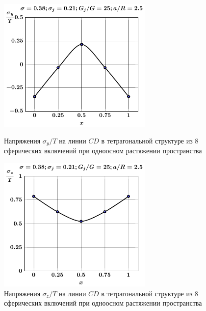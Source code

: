 \begin{russian}
%

\begin{figure}[h!]
\centering\footnotesize
\parbox[b]{7.5cm}{\centering\includegraphics[width=7.6cm]{inc8-a25-d95-g25-c-c-sig_y-spheres-tension1.pdf}
\caption{Напряжения $\sigma_y/T$ на линии $CD$ в тетрагональной структуре из 8 сферических включений при одноосном растяжении пространства
\label{f:8:22}}}\hfil\hfil
\parbox[b]{7.5cm}{\centering\includegraphics[width=7.6cm]{inc8-a25-d95-g25-c-c-sig_z-spheres-tension1.pdf}
\caption{Напряжения $\sigma_z/T$ на линии $CD$ в тетрагональной структуре из 8 сферических включений при одноосном растяжении пространства
\label{f:8:23}}}
\end{figure}


\end{russian}
